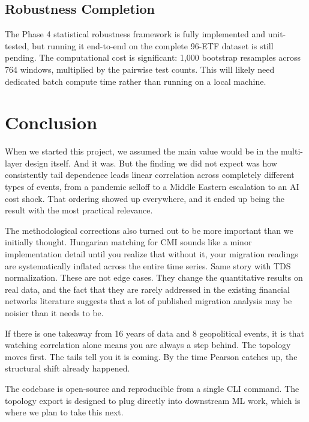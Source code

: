 \documentclass[12pt, letterpaper]{article}
\begin{document}
\subsection{Robustness Completion}

The Phase 4 statistical robustness framework is fully implemented and unit-tested, but running it end-to-end on the complete 96-ETF dataset is still pending. The computational cost is significant: 1,000 bootstrap resamples across 764 windows, multiplied by the pairwise test counts. This will likely need dedicated batch compute time rather than running on a local machine.

\section{Conclusion}

When we started this project, we assumed the main value would be in the multi-layer design itself. And it was. But the finding we did not expect was how consistently tail dependence leads linear correlation across completely different types of events, from a pandemic selloff to a Middle Eastern escalation to an AI cost shock. That ordering showed up everywhere, and it ended up being the result with the most practical relevance.

The methodological corrections also turned out to be more important than we initially thought. Hungarian matching for CMI sounds like a minor implementation detail until you realize that without it, your migration readings are systematically inflated across the entire time series. Same story with TDS normalization. These are not edge cases. They change the quantitative results on real data, and the fact that they are rarely addressed in the existing financial networks literature suggests that a lot of published migration analysis may be noisier than it needs to be.

If there is one takeaway from 16 years of data and 8 geopolitical events, it is that watching correlation alone means you are always a step behind. The topology moves first. The tails tell you it is coming. By the time Pearson catches up, the structural shift already happened.

The codebase is open-source and reproducible from a single CLI command. The topology export is designed to plug directly into downstream ML work, which is where we plan to take this next.
\end{document}
